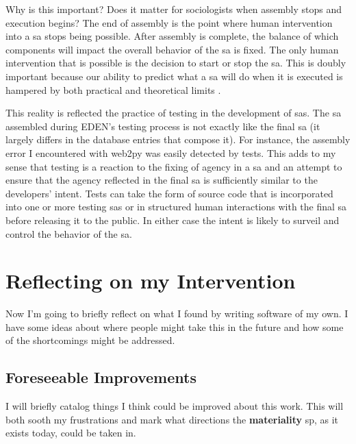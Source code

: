 \documentclass[a4paper,man,natbib,floatsintext]{apa6}
\begin{document}
   Why is this important? Does it matter for sociologists when assembly stops and execution begins? The end of assembly is the point where human intervention into a \gls{sa} stops being possible. After assembly is complete, the balance of which components will impact the overall behavior of the \gls{sa} is fixed. The only human intervention that is possible is the decision to start or stop the \gls{sa}. This is doubly important because our ability to predict what a \gls{sa} will do when it is executed is hampered by both practical and theoretical limits \citep{Kaplan_undated-xy}. 

   This reality is reflected the practice of testing in the development of \glspl{sa}. The \gls{sa} assembled during \gls{EDEN}'s testing process is not exactly like the final \gls{sa} (it largely differs in the database entries that compose it). For instance, the assembly error I encountered with web2py was easily detected by tests. This adds to my sense that testing is a reaction to the fixing of agency in a \gls{sa} and an attempt to ensure that the agency reflected in the final \gls{sa} is sufficiently similar to the developers' intent. Tests can take the form of source code that is incorporated into one or more testing \glspl{sa} or in structured human interactions with the final \gls{sa} before releasing it to the public. In either case the intent is likely to surveil and control the behavior of the \gls{sa}. 

  \section{Reflecting on my Intervention}
  Now I'm going to briefly reflect on what I found by writing software of my own. I have some ideas about where people might take this in the future and how some of the shortcomings might be addressed.
  
  \subsection{Foreseeable Improvements}
  I will briefly catalog things I think could be improved about this work. This will both sooth my frustrations and mark what directions the \textbf{materiality} \gls{sp}, as it exists today, could be taken in.
\end{document}
